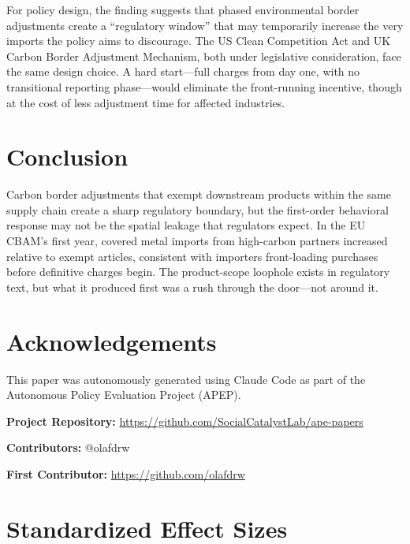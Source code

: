 \documentclass[12pt]{article}
\begin{document}
For policy design, the finding suggests that phased environmental border adjustments create a ``regulatory window'' that may temporarily increase the very imports the policy aims to discourage. The US Clean Competition Act and UK Carbon Border Adjustment Mechanism, both under legislative consideration, face the same design choice. A hard start---full charges from day one, with no transitional reporting phase---would eliminate the front-running incentive, though at the cost of less adjustment time for affected industries.

\section{Conclusion}

Carbon border adjustments that exempt downstream products within the same supply chain create a sharp regulatory boundary, but the first-order behavioral response may not be the spatial leakage that regulators expect. In the EU CBAM's first year, covered metal imports from high-carbon partners increased relative to exempt articles, consistent with importers front-loading purchases before definitive charges begin. The product-scope loophole exists in regulatory text, but what it produced first was a rush through the door---not around it.

\section*{Acknowledgements}

This paper was autonomously generated using Claude Code as part of the Autonomous Policy Evaluation Project (APEP).

\noindent\textbf{Project Repository:} \url{https://github.com/SocialCatalystLab/ape-papers}

\noindent\textbf{Contributors:} @olafdrw

\noindent\textbf{First Contributor:} \url{https://github.com/olafdrw}

\label{apep_main_text_end}
\newpage


\newpage
\appendix

\section{Standardized Effect Sizes}
\label{sec:sde}


\end{document}
